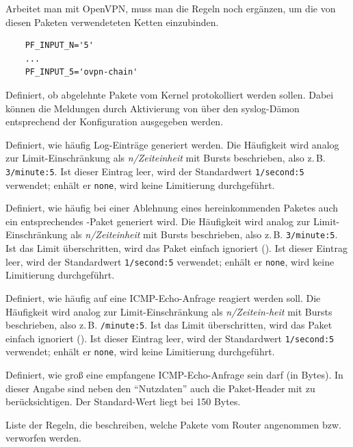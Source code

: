 \begin{description}
Arbeitet man mit OpenVPN, muss man die Regeln
noch ergänzen, um die von diesen Paketen verwendeteten Ketten
einzubinden.

\begin{example}
\begin{verbatim}
    PF_INPUT_N='5'
    ...
    PF_INPUT_5='ovpn-chain'
\end{verbatim}
\end{example}

Definiert, ob abgelehnte Pakete vom Kernel protokolliert werden sollen.
Dabei können die Meldungen durch Aktivierung von  über den
syslog-Dämon entsprechend der Konfiguration ausgegeben werden.

Definiert, wie häufig Log-Einträge generiert werden. Die Häufigkeit
wird analog zur Limit-Einschränkung als \emph{n/Zeiteinheit} mit Bursts
beschrieben, also z.\,B. \texttt{3/minute:5}. Ist dieser Eintrag leer, wird der
Standardwert \texttt{1/second:5} verwendet; enhält er \texttt{none}, wird keine
Limitierung durchgeführt.

Definiert, wie häufig bei einer Ablehnung eines hereinkommenden Paketes
auch ein entsprechendes -Paket generiert wird. Die Häufigkeit
wird analog zur Limit-Einschränkung als \emph{n/Zeiteinheit} mit Bursts
beschrieben, also z.\,B. \texttt{3/minute:5}. Ist das Limit überschritten, wird
das Paket einfach ignoriert (). Ist dieser Eintrag leer, wird
der Standardwert \texttt{1/second:5} verwendet; enhält er \texttt{none}, wird
keine Limitierung durchgeführt.

Definiert, wie häufig auf eine ICMP-Echo-Anfrage reagiert werden soll.
Die Häufigkeit wird analog zur Limit-Einschränkung als \emph{n/Zeitein-heit}
mit Bursts beschrieben, also z.\,B. \texttt{/minute:5}. Ist das
Limit überschritten, wird das Paket einfach ignoriert (). Ist
dieser Eintrag leer, wird der Standardwert \texttt{1/second:5} verwendet;
enhält er \texttt{none}, wird keine Limitierung durchgeführt.

Definiert, wie groß eine empfangene ICMP-Echo-Anfrage sein darf (in Bytes). In
dieser Angabe sind neben den ``Nutzdaten'' auch die Paket-Header mit zu
berücksichtigen. Der Standard-Wert liegt bei 150 Bytes.

Liste der Regeln, die beschreiben, welche Pakete vom Router angenommen
bzw. verworfen werden.
\end{description}

